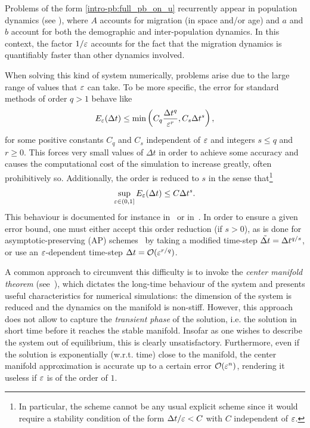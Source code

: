 %

Problems of the form \eqref{intro-pb:full_pb_on_u} recurrently appear in
population dynamics (see \cite{greiner.1994.singular, auger.1996.emergence,
sanchez.2000.singular, castella.2015.analysis}), where $A$ accounts for
migration (in space and/or age) and $a$ and $b$ account for both the
demographic and inter-population dynamics. In this context, the factor
$1/\varepsilon$ accounts for the fact that the migration dynamics is quantifiably
faster than other dynamics involved.

%

\medskip
When solving this kind of system numerically, problems arise due to the
large range of values that $\varepsilon$ can take. To be more specific, the error
for standard methods of order $q > 1$ behave like 
$$
E_{\varepsilon}(\Delta t) \leq \min\left(C_q \frac{\Delta t^q}{\varepsilon^r} , C_s \Delta t^s\right),
$$
for some positive constants $C_q$ and $C_s$ independent of $\varepsilon$ and
integers $s \leq q$ and $r \geq 0$. This  forces very small values of
$\Delta t$  in order to achieve some accuracy and causes the computational
cost of the simulation to increase greatly, often prohibitively so.
Additionally, the order is reduced to $s$ in the sense that\footnote{In
particular, the scheme cannot be any usual explicit scheme since it would
require a stability condition of the form $\Delta t/\varepsilon < C$ with $C$
independent of $\varepsilon$. } 
\begin{equation} \label{intro_eq:unif_error}
\sup_{\varepsilon \in (0,1]} E_{\varepsilon}(\Delta t) \leq C \Delta t^s . 
\end{equation} 
This behaviour is documented for instance
in~\cite[Section~IV.15]{hairer.1996.solving} or in~\cite{hundsdorfer.2007.imex}.
In order to ensure a given error bound, one must either accept this order
reduction (if $s > 0$), as is done for asymptotic-preserving (AP)
schemes~\cite{jin.1999.efficient} by taking a modified time-step
$\tilde{\Delta t} = \Delta t^{q/s}$, or use an $\varepsilon$-dependent time-step $\Delta t =
\mathcal{O}(\varepsilon^{r/q})$. 

A common approach to circumvent this difficulty is to invoke the
\textit{center manifold theorem} (see~\cite{vasileva.1963.asymptotic, carr.1982.applications,sakamoto.1990.invariant}), which dictates the long-time behaviour of the
system and presents useful characteristics for numerical simulations: the
dimension of the system is reduced and the dynamics on the manifold is
non-stiff. However, this approach does not allow to capture the
\textit{transient phase} of the solution, i.e. the solution in short time
before it reaches the stable manifold. Insofar as one wishes to describe
the system out of equilibrium, this is clearly unsatisfactory.
Furthermore, even if the solution is exponentially (w.r.t. time) close to
the manifold, the center manifold approximation is accurate up to a
certain error $\mathcal{O}(\varepsilon^n)$, rendering it useless if $\varepsilon$ is of the
order of $1$. 

